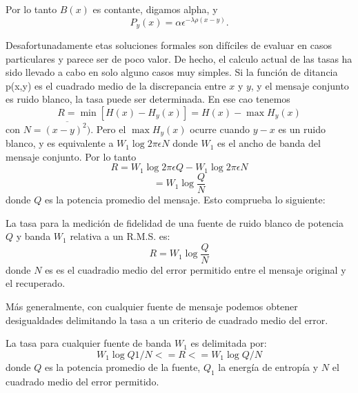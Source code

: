 Por lo tanto $B(x)$ es contante, digamos alpha, y
\begin{equation} P_{y}(x) = \alpha \epsilon^{ -\lambda \rho(x - y)}. \end{equation}
			
Desafortunadamente etas soluciones formales son dif\'iciles de evaluar
en casos particulares y parece ser de poco valor. De hecho, el calculo
actual de las tasas ha sido llevado a cabo en solo alguno casos muy
simples. Si la funci\'on de ditancia p(x,y) es el cuadrado medio de
la discrepancia entre $x$ y $y$, y el mensaje conjunto es ruido
blanco, la tasa puede ser determinada. En ese cao tenemos
\begin{equation} R = \min[ H(x) - H_{y}(x)] = H(x) - \max H_{y}(x) 
\end{equation}
con $N = \overline{(x-y)^{2})}$. Pero el $\max H_{y}(x)$ ocurre cuando
$y - x$ es un ruido blanco, y es equivalente a $W_{1} \log 2 \pi
\epsilon N$ donde $W_{1}$ es el ancho de banda del mensaje conjunto.
Por lo tanto
\begin{equation} R = W_{1} \log 2 \pi \epsilon Q - W_{1} \log 2 \pi \epsilon N \end{equation}
\begin{equation} = W_{1} \log \frac{Q}{N} \end{equation}
donde $Q$ es la potencia promedio del mensaje. Esto comprueba lo
siguiente:

\begin{theorem}
La tasa para la medici\'on de fidelidad de una fuente de ruido blanco
de potencia $Q$ y banda $W_{1}$ relativa a un R.M.S. es:
\begin{equation} R = W_{1} \log \frac{Q}{N} \end{equation}
donde $N$ es es el cuadradio medio del error permitido entre el
mensaje original y el recuperado.
\end{theorem}

M\'as generalmente, con cualquier fuente de mensaje podemos obtener
desigualdades delimitando la tasa a un criterio de cuadrado medio del
error.

\begin{theorem}
La tasa para cualquier fuente de banda $W_{1}$ es delimitada por:
\begin{equation} W_{1} \log Q1/N <= R <= W_{1} \log Q/N \end{equation}
donde $Q$ es la potencia promedio de la fuente, $Q_{1}$ la energ\'ia
de entrop\'ia y $N$ el cuadrado medio del error permitido.
\end{theorem}

